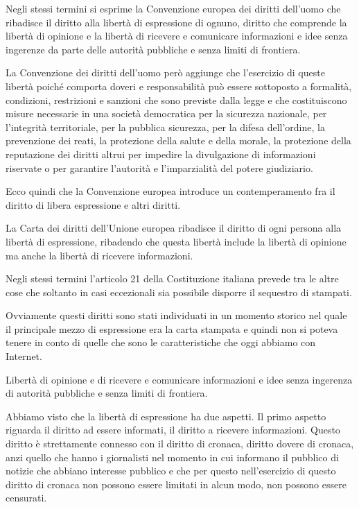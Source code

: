 Negli stessi termini si esprime la Convenzione europea dei diritti dell'uomo che ribadisce il diritto alla libertà di espressione di ognuno, diritto che comprende la libertà di opinione e la libertà di ricevere e comunicare informazioni e idee senza ingerenze da parte delle autorità pubbliche e senza limiti di frontiera.

La Convenzione dei diritti dell'uomo però aggiunge che l'esercizio di queste libertà poiché comporta doveri e responsabilità può essere sottoposto a formalità, condizioni, restrizioni e sanzioni che sono previste dalla legge e che costituiscono misure necessarie in una società democratica per la sicurezza nazionale, per l'integrità territoriale, per la pubblica sicurezza, per la difesa dell'ordine, la prevenzione dei reati, la protezione della salute e della morale, la protezione della reputazione dei diritti altrui per impedire la divulgazione di informazioni riservate o per garantire l'autorità e l'imparzialità del potere giudiziario.

Ecco quindi che la Convenzione europea introduce un contemperamento fra il diritto di libera espressione e altri diritti.

La Carta dei diritti dell'Unione europea ribadisce il diritto di ogni persona alla libertà di espressione, ribadendo che questa libertà include la libertà di opinione ma anche la libertà di ricevere informazioni.

Negli stessi termini l'articolo 21 della Costituzione italiana prevede tra le altre cose che soltanto in casi eccezionali sia possibile disporre il sequestro di stampati.

Ovviamente questi diritti sono stati individuati in un momento storico nel quale il principale mezzo di espressione era la carta stampata e quindi non si poteva tenere in conto di quelle che sono le caratteristiche che oggi abbiamo con Internet.

Libertà di opinione e di ricevere e comunicare informazioni e idee senza ingerenza di autorità pubbliche e senza limiti di frontiera. 

Abbiamo visto che la libertà di espressione ha due aspetti. Il primo aspetto riguarda il diritto ad essere informati, il diritto a ricevere informazioni. Questo diritto è strettamente connesso con il diritto di cronaca, diritto dovere di cronaca, anzi quello che hanno i giornalisti nel momento in cui informano il pubblico di notizie che abbiano interesse pubblico e che per questo nell'esercizio di questo diritto di cronaca non possono essere limitati in alcun modo, non possono essere censurati. 

